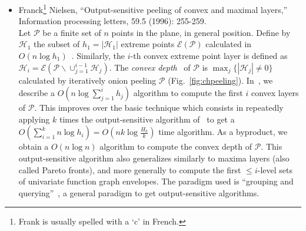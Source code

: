 \documentclass{article}
\def\calP{\mathcal{P}}
\def\calH{\mathcal{H}}
\def\calE{\mathcal{E}}
\def\defterm#1{{\em #1}}
\begin{document}
\begin{itemize}

\item Franck\footnote{Frank is usually spelled with a `c' in French.} Nielsen,  ``Output-sensitive peeling of convex and maximal layers,'' Information processing letters, 59.5 (1996): 255-259.\\

Let $\calP$ be a finite set of $n$ points in the plane, in general position.
Define by $\calH_1$ the subset of $h_1=|\calH_1|$ extreme points $\calE(\calP)$ calculated in $O(n\log h_1)$~\cite{UltimateCH-1986}.
Similarly, the $i$-th convex extreme point layer is defined as $\calH_i=\calE\left(\calP\backslash \cup_{j=1}^{i-1} \calH_j\right)$. 
The \defterm{convex depth}~\cite{ConvexLayers-1985} of $\calP$ is $\max_j \{|\calH_j|\not=0\}$ calculated by iteratively onion peeling $\calP$ (Fig.~\ref{fig:chpeeling}).
In~\cite{OSPeeling-1996}, we describe a $O(n\log \sum_{j=1}^i h_j)$ algorithm to compute the first $i$ convex layers of $\calP$.
This improves over the basic technique which consists in repeatedly applying $k$ times the output-sensitive algorithm of~\cite{UltimateCH-1986} to get a 
$O(\sum_{i=1}^k n\log h_i)=O(nk\log \frac{H_k}{k})$ time algorithm.
As a byproduct, we obtain a $O(n\log n)$ algorithm to compute the convex depth of $\calP$. 
This output-sensitive algorithm also generalizes similarly to maxima layers (also called Pareto fronts), and more generally to compute the first $\leq i$-level sets of univariate function graph envelopes.
The paradigm used is ``grouping and querying''~\cite{GroupingQuerying-1998}, a general paradigm to get output-sensitive algorithms.


\end{itemize}
\end{document}
